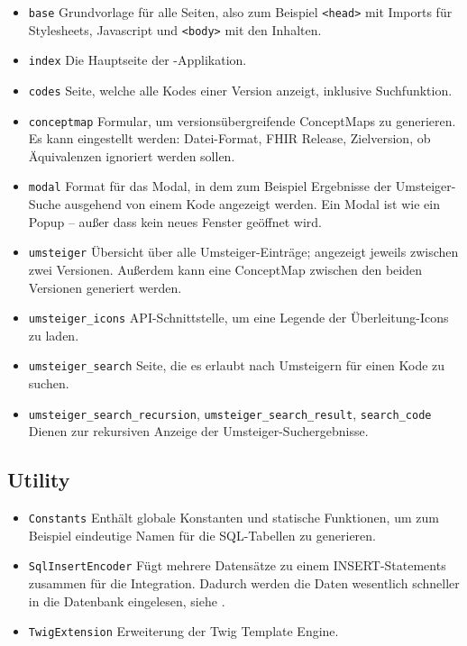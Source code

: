 \begin{itemize}
\item \texttt{base} \newline Grundvorlage für alle Seiten, also zum Beispiel \texttt{<head>} mit Imports für Stylesheets, Javascript und \texttt{<body>} mit den Inhalten.
\item \texttt{index} \newline Die Hauptseite der \bfarmer-Applikation. 
\item \texttt{codes} \newline Seite, welche alle Kodes einer Version anzeigt, inklusive Suchfunktion. 
\item \texttt{conceptmap} \newline Formular, um versionsübergreifende ConceptMaps zu generieren. Es kann eingestellt werden: Datei-Format, FHIR Release, Zielversion, ob Äquivalenzen ignoriert werden sollen.
\item \texttt{modal} \newline Format für das Modal, in dem zum Beispiel Ergebnisse der Umsteiger-Suche ausgehend von einem Kode angezeigt werden. Ein Modal ist wie ein Popup -- außer dass kein neues Fenster geöffnet wird. 
\item \texttt{umsteiger} \newline Übersicht über alle Umsteiger-Einträge; angezeigt jeweils zwischen zwei Versionen. Außerdem kann eine ConceptMap zwischen den beiden Versionen generiert werden. 
\item \texttt{umsteiger\_icons} \newline API-Schnittstelle, um eine Legende der Überleitung-Icons zu laden. 
\item \texttt{umsteiger\_search} \newline Seite, die es erlaubt nach Umsteigern für einen Kode zu suchen. 
\item \texttt{umsteiger\_search\_recursion}, \texttt{umsteiger\_search\_result}, \texttt{search\_code} \newline Dienen zur rekursiven Anzeige der Umsteiger-Suchergebnisse.
\end{itemize}

\subsection{Utility}

\begin{itemize}
\item \texttt{Constants} \newline Enthält globale Konstanten und statische Funktionen, um zum Beispiel eindeutige Namen für die SQL-Tabellen zu generieren. 
\item \texttt{SqlInsertEncoder} \newline Fügt mehrere Datensätze zu einem INSERT-Statements zusammen für die Integration. Dadurch werden die Daten wesentlich schneller in die Datenbank eingelesen, siehe \cite{mysql-insert}.
\item \texttt{TwigExtension} \newline Erweiterung der Twig Template Engine.
\end{itemize}

